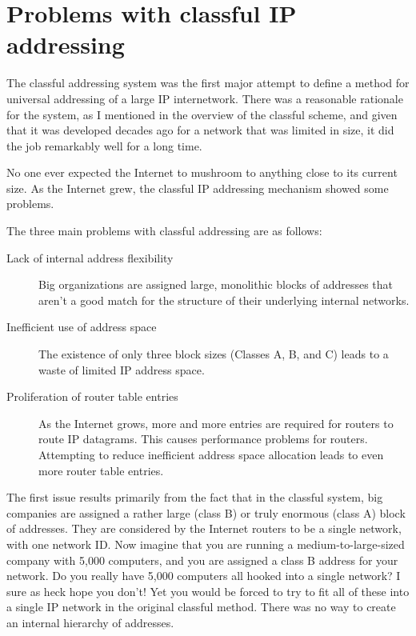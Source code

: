 \section{Problems with classful IP addressing}

The classful addressing system was the first major attempt to define a
method for universal addressing of a large IP internetwork. There was a
reasonable rationale for the system, as I mentioned in the overview of
the classful scheme, and given that it was developed decades ago for a
network that was limited in size, it did the job remarkably well for a
long time.

No one ever expected the Internet to mushroom to anything close to its
current size. As the Internet grew, the classful IP addressing mechanism
showed some problems.

The three main problems with classful addressing are as follows:
\begin{description}
   \item[Lack of internal address flexibility]
      Big organizations are assigned large, monolithic blocks of addresses that aren't a good match for the structure of their underlying internal networks.

   \item[Inefficient use of address space]
      The existence of only three block sizes (Classes A, B, and C) leads to a waste of limited IP address space.

   \item[Proliferation of router table entries]
      As the Internet grows, more and more entries are required for routers to route IP datagrams.
      This causes performance problems for routers.
      Attempting to reduce inefficient address space allocation leads to even more router table entries.
\end{description}

The first issue results primarily from the fact that in the classful
system, big companies are assigned a rather large (class B) or truly
enormous (class A) block of addresses. They are considered by the
Internet routers to be a single network, with one network ID. Now
imagine that you are running a medium-to-large-sized company with 5,000
computers, and you are assigned a class B address for your network. Do
you really have 5,000 computers all hooked into a single network? I sure
as heck hope you don't! Yet you would be forced to try to fit all of
these into a single IP network in the original classful method. There
was no way to create an internal hierarchy of addresses.

